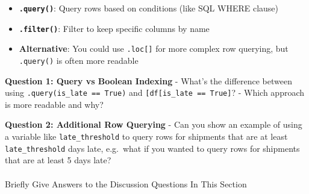 \documentclass[
]{article}
\makeatletter
\let\oldparagraph\paragraph
\renewcommand{\paragraph}{
    \@ifstar
      \xxxParagraphStar
      \xxxParagraphNoStar
  }
\newcommand{\xxxParagraphStar}[1]{\oldparagraph*{#1}\mbox{}}
\newcommand{\xxxParagraphNoStar}[1]{\oldparagraph{#1}\mbox{}}
\providecommand{\tightlist}{%
  \setlength{\itemsep}{0pt}\setlength{\parskip}{0pt}}
\makeatother
\begin{document}
\begin{tcolorbox}[enhanced jigsaw, colbacktitle=quarto-callout-note-color!10!white, toptitle=1mm, colframe=quarto-callout-note-color-frame, bottomtitle=1mm, colback=white, left=2mm, breakable, coltitle=black, bottomrule=.15mm, rightrule=.15mm, titlerule=0mm, opacityback=0, title=\textcolor{quarto-callout-note-color}{\faInfo}\hspace{0.5em}{🔍 Understanding the Methods}, arc=.35mm, opacitybacktitle=0.6, toprule=.15mm, leftrule=.75mm]

\begin{itemize}
\tightlist
\item
  \textbf{\texttt{.query()}}: Query rows based on conditions (like SQL
  WHERE clause)
\item
  \textbf{\texttt{.filter()}}: Filter to keep specific columns by name
\item
  \textbf{Alternative}: You could use \texttt{.loc{[}{]}} for more
  complex row querying, but \texttt{.query()} is often more readable
\end{itemize}

\end{tcolorbox}

\begin{tcolorbox}[enhanced jigsaw, colbacktitle=quarto-callout-important-color!10!white, toptitle=1mm, colframe=quarto-callout-important-color-frame, bottomtitle=1mm, colback=white, left=2mm, breakable, coltitle=black, bottomrule=.15mm, rightrule=.15mm, titlerule=0mm, opacityback=0, title=\textcolor{quarto-callout-important-color}{\faExclamation}\hspace{0.5em}{🤔 Discussion Questions: Subset Mental Model}, arc=.35mm, opacitybacktitle=0.6, toprule=.15mm, leftrule=.75mm]

\textbf{Question 1: Query vs Boolean Indexing} - What's the difference
between using
\texttt{.query(\textquotesingle{}is\_late\ ==\ True\textquotesingle{})}
and
\texttt{{[}df{[}\textquotesingle{}is\_late\textquotesingle{}{]}\ ==\ True{]}}?
- Which approach is more readable and why?

\textbf{Question 2: Additional Row Querying} - Can you show an example
of using a variable like \texttt{late\_threshold} to query rows for
shipments that are at least \texttt{late\_threshold} days late,
e.g.~what if you wanted to query rows for shipments that are at least 5
days late?

\end{tcolorbox}

\paragraph{Briefly Give Answers to the Discussion Questions In This
Section}\label{briefly-give-answers-to-the-discussion-questions-in-this-section-1}
\end{document}
